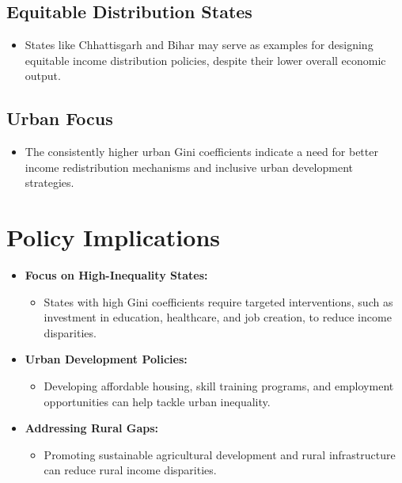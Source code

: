 \documentclass{article}
\begin{document}
	\subsection*{Equitable Distribution States}
	\begin{itemize}
		\item States like Chhattisgarh and Bihar may serve as examples for designing equitable income distribution policies, despite their lower overall economic output.
	\end{itemize}
	
	\subsection*{Urban Focus}
	\begin{itemize}
		\item The consistently higher urban Gini coefficients indicate a need for better income redistribution mechanisms and inclusive urban development strategies.
	\end{itemize}
	

   \section*{Policy Implications}
   
   \begin{itemize}
   	\item \textbf{Focus on High-Inequality States:}
   	\begin{itemize}
   		\item States with high Gini coefficients require targeted interventions, such as investment in education, healthcare, and job creation, to reduce income disparities.
   	\end{itemize}
   	
   	\item \textbf{Urban Development Policies:}
   	\begin{itemize}
   		\item Developing affordable housing, skill training programs, and employment opportunities can help tackle urban inequality.
   	\end{itemize}
   	
   	\item \textbf{Addressing Rural Gaps:}
   	\begin{itemize}
   		\item Promoting sustainable agricultural development and rural infrastructure can reduce rural income disparities.
   	\end{itemize}
   \end{itemize}
   
\end{document}
